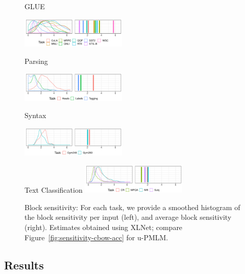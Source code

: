 \documentclass[11pt,a4paper]{article}
\begin{document}
\begin{figure}
    \centering
	\footnotesize{GLUE}

    \includegraphics[width=0.45\textwidth]{code/analyze/joint_GLUE.pdf}

	Parsing

    \includegraphics[width=0.45\textwidth]{code/analyze/joint_Parsing.pdf}

	Syntax

    \includegraphics[width=0.45\textwidth]{code/analyze/joint_Syntax.pdf}

	Text Classification
    \includegraphics[width=0.45\textwidth]{code/analyze/joint_textclas.pdf}
\caption{Block sensitivity: For each task, we provide a smoothed histogram of the block sensitivity per input (left), and average block sensitivity (right). Estimates obtained using XLNet; compare Figure~\ref{fig:sensitivity-cbow-acc} for u-PMLM.}
    \label{fig:histograms-byTask}
\end{figure}



\subsection{Results}
\end{document}

